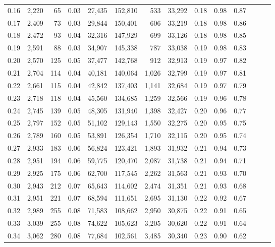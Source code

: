 \begin{tabular}{rrrrrrrrrrrrrr}
0.16 &  2,220 &   65 &  0.03 &   27,435 &  152,810 &     533 &  33,292 &  0.18 &  0.98 &      0.87 \\
0.17 &  2,409 &   73 &  0.03 &   29,844 &  150,401 &     606 &  33,219 &  0.18 &  0.98 &      0.86 \\
0.18 &  2,472 &   93 &  0.04 &   32,316 &  147,929 &     699 &  33,126 &  0.18 &  0.98 &      0.85 \\
0.19 &  2,591 &   88 &  0.03 &   34,907 &  145,338 &     787 &  33,038 &  0.19 &  0.98 &      0.83 \\
0.20 &  2,570 &  125 &  0.05 &   37,477 &  142,768 &     912 &  32,913 &  0.19 &  0.97 &      0.82 \\
0.21 &  2,704 &  114 &  0.04 &   40,181 &  140,064 &   1,026 &  32,799 &  0.19 &  0.97 &      0.81 \\
0.22 &  2,661 &  115 &  0.04 &   42,842 &  137,403 &   1,141 &  32,684 &  0.19 &  0.97 &      0.79 \\
0.23 &  2,718 &  118 &  0.04 &   45,560 &  134,685 &   1,259 &  32,566 &  0.19 &  0.96 &      0.78 \\
0.24 &  2,745 &  139 &  0.05 &   48,305 &  131,940 &   1,398 &  32,427 &  0.20 &  0.96 &      0.77 \\
0.25 &  2,797 &  152 &  0.05 &   51,102 &  129,143 &   1,550 &  32,275 &  0.20 &  0.95 &      0.75 \\
0.26 &  2,789 &  160 &  0.05 &   53,891 &  126,354 &   1,710 &  32,115 &  0.20 &  0.95 &      0.74 \\
0.27 &  2,933 &  183 &  0.06 &   56,824 &  123,421 &   1,893 &  31,932 &  0.21 &  0.94 &      0.73 \\
0.28 &  2,951 &  194 &  0.06 &   59,775 &  120,470 &   2,087 &  31,738 &  0.21 &  0.94 &      0.71 \\
0.29 &  2,925 &  175 &  0.06 &   62,700 &  117,545 &   2,262 &  31,563 &  0.21 &  0.93 &      0.70 \\
0.30 &  2,943 &  212 &  0.07 &   65,643 &  114,602 &   2,474 &  31,351 &  0.21 &  0.93 &      0.68 \\
0.31 &  2,951 &  221 &  0.07 &   68,594 &  111,651 &   2,695 &  31,130 &  0.22 &  0.92 &      0.67 \\
0.32 &  2,989 &  255 &  0.08 &   71,583 &  108,662 &   2,950 &  30,875 &  0.22 &  0.91 &      0.65 \\
0.33 &  3,039 &  255 &  0.08 &   74,622 &  105,623 &   3,205 &  30,620 &  0.22 &  0.91 &      0.64 \\
0.34 &  3,062 &  280 &  0.08 &   77,684 &  102,561 &   3,485 &  30,340 &  0.23 &  0.90 &      0.62 \\

\end{tabular}
